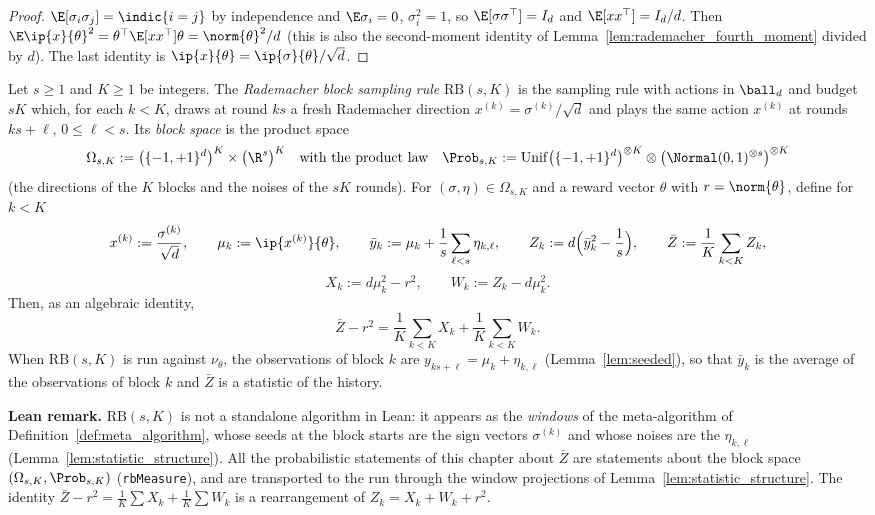 \begin{proof}
\leanok
{}
$\E[\sigma_i\sigma_j] = \indic\{i = j\}$ by independence and $\E\sigma_i = 0$,
$\sigma_i^2 = 1$, so $\E[\sigma\sigma^\top] = I_d$ and $\E[xx^\top] = I_d/d$. Then
$\E\ip{x}{\theta}^2 = \theta^\top\E[xx^\top]\theta = \norm{\theta}^2/d$ (this is also the
second-moment identity of Lemma~\ref{lem:rademacher_fourth_moment} divided by $d$). The last
identity is $\ip{x}{\theta} = \ip{\sigma}{\theta}/\sqrt d$.
\end{proof}

\begin{definition}\label{def:squared_statistic}
\leanok
{}
Let $s \ge 1$ and $K \ge 1$ be integers. The \emph{Rademacher block sampling rule}
$\mathrm{RB}(s, K)$ is the sampling rule with actions in $\ball_d$ and budget $sK$ which, for
each $k < K$, draws at round $ks$ a fresh Rademacher direction $x^{(k)} = \sigma^{(k)}/\sqrt d$
and plays the same action $x^{(k)}$ at rounds $ks + \ell$, $0 \le \ell < s$. Its
\emph{block space} is the product space
\[
  \Omega_{s,K} := \big(\{-1,+1\}^d\big)^K \times \big(\R^s\big)^K
  \quad\text{with the product law}\quad
  \Prob_{s,K} := \mathrm{Unif}\big(\{-1,+1\}^d\big)^{\otimes K} \otimes
    \big(\Normal(0,1)^{\otimes s}\big)^{\otimes K}
\]
(the directions of the $K$ blocks and the noises of the $sK$ rounds). For
$(\sigma, \eta) \in \Omega_{s,K}$ and a reward vector $\theta$ with $r = \norm{\theta}$, define
for $k < K$
\[
  x^{(k)} := \frac{\sigma^{(k)}}{\sqrt d}, \qquad
  \mu_k := \ip{x^{(k)}}{\theta}, \qquad
  \bar y_k := \mu_k + \frac1s \sum_{\ell < s} \eta_{k,\ell}, \qquad
  Z_k := d\Big( \bar y_k^2 - \frac1s \Big), \qquad
  \bar Z := \frac1K \sum_{k<K} Z_k ,
\]
\[
  X_k := d\mu_k^2 - r^2, \qquad
  W_k := Z_k - d\mu_k^2 .
\]
Then, as an algebraic identity,
\[
  \bar Z - r^2 = \frac1K \sum_{k<K} X_k + \frac1K \sum_{k<K} W_k .
\]
When $\mathrm{RB}(s,K)$ is run against $\nu_\theta$, the observations of block $k$ are
$y_{ks+\ell} = \mu_k + \eta_{k,\ell}$ (Lemma~\ref{lem:seeded}), so that $\bar y_k$ is the
average of the observations of block $k$ and $\bar Z$ is a statistic of the history.
\end{definition}

\textbf{Lean remark.} $\mathrm{RB}(s,K)$ is not a standalone algorithm in Lean: it appears as
the \emph{windows} of the meta-algorithm of Definition~\ref{def:meta_algorithm}, whose seeds
at the block starts are the sign vectors $\sigma^{(k)}$ and whose noises are the
$\eta_{k,\ell}$ (Lemma~\ref{lem:statistic_structure}). All the probabilistic statements of
this chapter about $\bar Z$ are statements about the block space
$(\Omega_{s,K}, \Prob_{s,K})$ (\texttt{rbMeasure}), and are transported to the run through the
window projections of Lemma~\ref{lem:statistic_structure}. The identity
$\bar Z - r^2 = \frac1K\sum X_k + \frac1K\sum W_k$ is a rearrangement of
$Z_k = X_k + W_k + r^2$.

